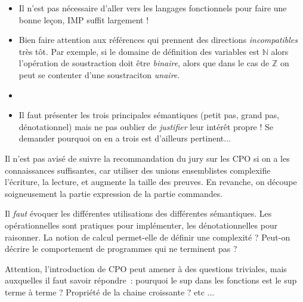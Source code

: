 \documentclass{agregfiche}
\begin{document}
\secpieges

\begin{itemize}
    \item Il n'est pas nécessaire d'aller vers les langages fonctionnels
        pour faire une bonne leçon, IMP suffit largement !
    \item Bien faire attention aux références qui prennent des directions 
        \emph{incompatibles} très tôt. Par exemple, si le domaine de définition
        des variables est $\mathbb{N}$ alors l'opération de soustraction 
        doit être \emph{binaire}, alors que dans le cas de $\mathbb{Z}$ on peut 
        se contenter d'une soustraciton \emph{unaire}.
    \item {}
    \item Il faut présenter les trois principales sémantiques (petit pas, grand
        pas, dénotationnel) mais ne pas oublier de \emph{justifier} leur intérêt
        propre ! Se demander pourquoi on en a trois est d'ailleurs pertinent...
\end{itemize}

\secidees

Il n'est pas avisé de suivre la recommandation du jury sur les CPO si 
on a les connaissances suffisantes, car utiliser des unions ensemblistes 
complexifie l'écriture, la lecture, et augmente la taille des preuves.
En revanche, on découpe soigneusement la
partie expression de la partie commandes.

Il \emph{faut} évoquer les différentes utilisations des différentes
sémantiques. Les opérationnelles sont pratiques pour implémenter, les
dénotationnelles pour raisonner. La notion de calcul permet-elle de définir
une complexité ? Peut-on décrire le comportement de programmes qui ne
terminent pas ? 

Attention, l'introduction de CPO peut amener à des questions triviales, mais
auxquelles il faut savoir répondre~: pourquoi le sup dans les fonctions est
le sup terme à terme ? Propriété de la chaine croissante ? etc ...

\secquestionsclassiques
\end{document}
